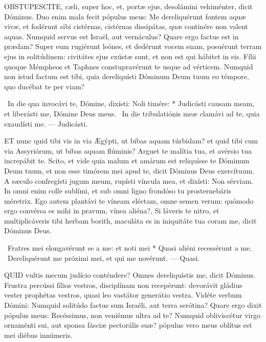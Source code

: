 



\lettrine[lines=2]{O}{BSTUPESCITE}, cæli, super hoc, et, portæ ejus, desolámini vehiménter, dicit Dóminus. Duo enim mala fecit pópulus meus: Me dereliquérunt fontem aquæ vivæ, et fodérunt sibi cistérnas, cistérnas dissipátas, quæ continére non valent aquas. Numquid servus est Israël, aut vernáculus? Quare ergo factus est in prædam? Super eum rugiérunt leónes, et dedérunt vocem suam, posuérunt terram ejus in solitúdinem: civitátes ejus exústæ sunt, et non est qui hábitet in eis. Fílii quoque Mémpheos et Taphnes constupravérunt te usque ad vérticem. Numquid non istud factum est tibi, quia dereliquísti Dóminum Deum tuum eo témpore, quo ducébat te per viam?

\R\ In die qua invocávi te, Dómine, dixísti: Noli timére: * Judicásti causam meam, et liberásti me, Dómine Deus meus. \V\ In die tribulatiónis meæ clamávi ad te, quia exaudísti me. --- Judicásti.


\lettrine[lines=2]{E}{T} nunc quid tibi vis in via Ægýpti, ut bibas aquam túrbidam? et quid tibi cum via Assyriórum, ut bibas aquam flúminis? Arguet te malítia tua, et avérsio tua increpábit te. Scito, et vide quia malum et amárum est reliquísse te Dóminum Deum tuum, et non esse timórem mei apud te, dicit Dóminus Deus exercítuum. A sæculo confregísti jugum meum, rupísti víncula mea, et dixísti: Non sérviam. In omni enim colle sublími, et sub omni ligno frondóso tu prosternebáris méretrix. Ego autem plantávi te víneam eléctam, omne semen verum: quómodo ergo convérsa es mihi in pravum, vínea aliéna?, Si láveris te nitro, et multiplicáveris tibi herbam borith, maculáta es in iniquitáte tua coram me, dicit Dóminus Deus.

\R\ Fratres mei elongavérunt se a me: et noti mei * Quasi aliéni recessérunt a me. \V\ Dereliquérunt me próximi mei, et qui me novérunt. --- Quasi.


\lettrine[lines=2]{Q}{UID} vultis mecum judício conténdere? Omnes dereliquístis me, dicit Dóminus. Frustra percússi fílios vestros, disciplínam non recepérunt: devorávit gládius vester prophétas vestros, quasi leo vastátor generátio vestra. Vidéte verbum Dómini: Numquid solitúdo factus sum Israéli, aut terra serótina? Quare ergo dixit pópulus meus: Recéssimus, non veniémus ultra ad te? Numquid obliviscétur virgo ornaménti sui, aut sponsa fásciæ pectorális suæ? pópulus vero meus oblítus est mei diébus innúmeris.


